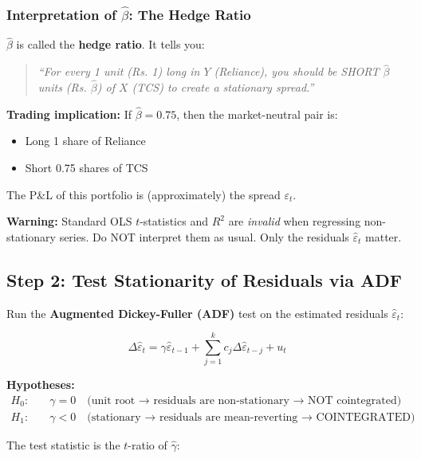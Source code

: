 \documentclass[12pt, a4paper]{article}
\begin{document}
\subsubsection{Interpretation of $\hat{\beta}$: The Hedge Ratio}

$\hat{\beta}$ is called the \textbf{hedge ratio}. It tells you:

\begin{quote}
    \textit{``For every 1 unit (Rs.
    1) long in $Y$ (Reliance), you should be SHORT $\hat\beta$ units (Rs.
    $\hat\beta$) of $X$ (TCS) to create a stationary spread.''}
\end{quote}

\textbf{Trading implication:} If $\hat\beta = 0.75$, then the market-neutral pair is:
\begin{itemize}
    \item Long 1 share of Reliance
    \item Short 0.75 shares of TCS
\end{itemize}

The P\&L of this portfolio is (approximately) the spread $\varepsilon_t$.

\medskip
\textbf{Warning:} Standard OLS $t$-statistics and $R^2$ are \emph{invalid} when regressing 
non-stationary series. Do NOT interpret them as usual. Only the residuals $\hat\varepsilon_t$ matter.

\subsection{Step 2: Test Stationarity of Residuals via ADF}

Run the \textbf{Augmented Dickey-Fuller (ADF)} test on the estimated residuals $\hat\varepsilon_t$:

\begin{equation}
    \boxed{\Delta\hat\varepsilon_t = \gamma \hat\varepsilon_{t-1} + 
    \sum_{j=1}^{k} c_j \Delta\hat\varepsilon_{t-j} + u_t}
    \label{eq:adf_resid}
\end{equation}

\textbf{Hypotheses:}
\begin{align*}
    H_0: & \quad \gamma = 0 \quad \text{(unit root → residuals are non-stationary → NOT cointegrated)} \\
    H_1: & \quad \gamma < 0 \quad \text{(stationary → residuals are mean-reverting → COINTEGRATED)}
\end{align*}

The test statistic is the $t$-ratio of $\hat\gamma$:
\end{document}
